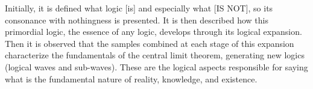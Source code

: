 Initially, it is defined what logic [is] and especially what [IS NOT], so its consonance with nothingness is presented. It is then described how this primordial logic, the essence of any logic, develops through its logical expansion. Then it is observed that the samples combined at each stage of this expansion characterize the fundamentals of the central limit theorem, generating new logics (logical waves and sub-waves). These are the logical aspects responsible for saying what is the fundamental nature of reality, knowledge, and existence. 

\bigbreak